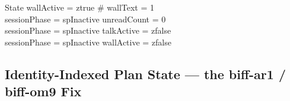 \documentclass[a4paper,10pt,fleqn]{article}
\begin{document}
\begin{schema}{State}
  wallActive = ztrue \implies \# wallText = 1 \\
  sessionPhase = spInactive \implies unreadCount = 0 \\
  sessionPhase = spInactive \implies talkActive = zfalse \\
  sessionPhase = spInactive \implies wallActive = zfalse
\end{schema}

\subsection{Identity-Indexed Plan State --- the biff-ar1 / biff-om9 Fix}
\label{sec:om9}

\end{document}
